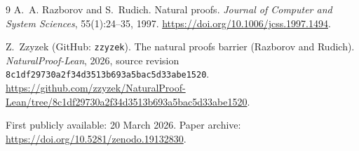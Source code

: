 \documentclass[11pt]{amsart}
\theoremstyle{plain}
\theoremstyle{definition}
\begin{document}
\begin{thebibliography}{9}
A.~A. Razborov and S.~Rudich.
\newblock Natural proofs.
\newblock \emph{Journal of Computer and System Sciences},
  55(1):24--35, 1997.
\newblock \url{https://doi.org/10.1006/jcss.1997.1494}.

Z.~Zzyzek (GitHub: \texttt{zzyzek}).
\newblock The natural proofs barrier (Razborov and Rudich).
\newblock \emph{NaturalProof-Lean}, 2026, source revision
  \texttt{8c1df29730a2f34d3513b693a5bac5d33abe1520}.
\newblock \url{https://github.com/zzyzek/NaturalProof-Lean/tree/8c1df29730a2f34d3513b693a5bac5d33abe1520}.
\end{thebibliography}

\bigskip\noindent\small
First publicly available: 20 March 2026.
Paper archive: \url{https://doi.org/10.5281/zenodo.19132830}.
\end{document}

